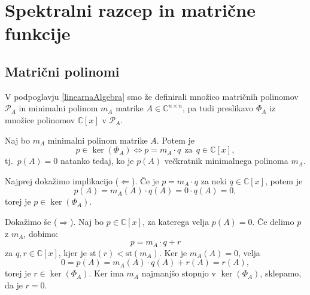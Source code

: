 \documentclass[mat1]{fmfdelo}
\newcommand{\C}{\mathbb C}
\begin{document}
\section{Spektralni razcep in matrične funkcije}
\subsection{Matrični polinomi}
V podpoglavju \ref{linearnaAlgebra} smo že definirali množico matričnih polinomov $\mathcal{P}_A$ in minimalni polinom $m_A$ matrike $A \in \C^{n \times n}$, pa tudi preslikavo $\Phi_A$ iz množice polinomov $\C [x]$ v $\mathcal{P}_A$.
\begin{trditev}\label{trditevMinimalniPolinom}
    Naj bo $m_A$ minimalni polinom matrike $A$. Potem je
    \begin{equation*}
        p \in \ker \left(\Phi_A\right) \Leftrightarrow p = m_A \cdot q\ \  \text{za}\ \ q \in \C [x],
    \end{equation*}
    tj.\ $p(A) = 0$ natanko tedaj, ko je $p(A)$ večkratnik minimalnega polinoma $m_A$.
\end{trditev}
\begin{dokaz}
    Najprej dokažimo implikacijo ($\Leftarrow$). Če je $p = m_A\cdot q$ za neki $q \in \C [x]$, potem je
    \begin{equation*}
        p(A) = m_A(A) \cdot q(A) = 0 \cdot q(A) = 0,
    \end{equation*}
    torej je $p \in \ker\left(\Phi_A\right)$.
    
    Dokažimo še ($\Rightarrow$). Naj bo $p \in \C [x]$, za katerega velja $p(A) = 0$. Če delimo $p$ z $m_A$, dobimo:
    \begin{equation*}
        p = m_A \cdot q + r
    \end{equation*}
    za $q, r \in \C [x]$, kjer je $\text{st}(r) < \text{st}\left(m_A\right)$. Ker je $m_A(A) = 0$, velja
    \begin{equation*}
        0 = p(A) = m_A(A) \cdot q(A) + r(A) = r(A),
    \end{equation*}
    torej je $r \in \ker\left(\Phi_A\right)$. Ker ima $m_A$ najmanjšo stopnjo v $\ker\left(\Phi_A\right)$, sklepamo, da je $r = 0$.
\end{dokaz}
\end{document}
